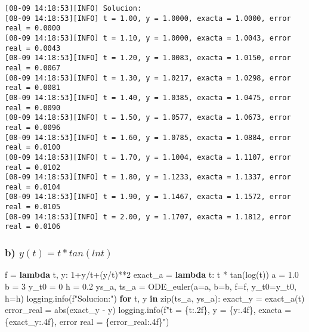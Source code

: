 \documentclass[
  letterpaper,
  DIV=11,
  numbers=noendperiod]{scrartcl}
\newenvironment{Shaded}{\begin{snugshade}}{\end{snugshade}}
\newcommand{\BuiltInTok}[1]{\textcolor[rgb]{0.00,0.23,0.31}{#1}}
\newcommand{\ControlFlowTok}[1]{\textcolor[rgb]{0.00,0.23,0.31}{\textbf{#1}}}
\newcommand{\DecValTok}[1]{\textcolor[rgb]{0.68,0.00,0.00}{#1}}
\newcommand{\FloatTok}[1]{\textcolor[rgb]{0.68,0.00,0.00}{#1}}
\newcommand{\KeywordTok}[1]{\textcolor[rgb]{0.00,0.23,0.31}{\textbf{#1}}}
\newcommand{\NormalTok}[1]{\textcolor[rgb]{0.00,0.23,0.31}{#1}}
\newcommand{\OperatorTok}[1]{\textcolor[rgb]{0.37,0.37,0.37}{#1}}
\newcommand{\SpecialCharTok}[1]{\textcolor[rgb]{0.37,0.37,0.37}{#1}}
\newcommand{\SpecialStringTok}[1]{\textcolor[rgb]{0.13,0.47,0.30}{#1}}
\begin{document}
\begin{verbatim}
[08-09 14:18:53][INFO] Solucion:
[08-09 14:18:53][INFO] t = 1.00, y = 1.0000, exacta = 1.0000, error real = 0.0000
[08-09 14:18:53][INFO] t = 1.10, y = 1.0000, exacta = 1.0043, error real = 0.0043
[08-09 14:18:53][INFO] t = 1.20, y = 1.0083, exacta = 1.0150, error real = 0.0067
[08-09 14:18:53][INFO] t = 1.30, y = 1.0217, exacta = 1.0298, error real = 0.0081
[08-09 14:18:53][INFO] t = 1.40, y = 1.0385, exacta = 1.0475, error real = 0.0090
[08-09 14:18:53][INFO] t = 1.50, y = 1.0577, exacta = 1.0673, error real = 0.0096
[08-09 14:18:53][INFO] t = 1.60, y = 1.0785, exacta = 1.0884, error real = 0.0100
[08-09 14:18:53][INFO] t = 1.70, y = 1.1004, exacta = 1.1107, error real = 0.0102
[08-09 14:18:53][INFO] t = 1.80, y = 1.1233, exacta = 1.1337, error real = 0.0104
[08-09 14:18:53][INFO] t = 1.90, y = 1.1467, exacta = 1.1572, error real = 0.0105
[08-09 14:18:53][INFO] t = 2.00, y = 1.1707, exacta = 1.1812, error real = 0.0106
\end{verbatim}

\subsubsection{\texorpdfstring{b)
\(y(t)=t *tan(ln t)\)}{b) y(t)=t *tan(ln t)}}\label{b-ytt-tanln-t}

\begin{Shaded}
\begin{Highlighting}[]
\NormalTok{f }\OperatorTok{=} \KeywordTok{lambda}\NormalTok{ t, y: }\DecValTok{1}\OperatorTok{+}\NormalTok{y}\OperatorTok{/}\NormalTok{t}\OperatorTok{+}\NormalTok{(y}\OperatorTok{/}\NormalTok{t)}\OperatorTok{**}\DecValTok{2}
\NormalTok{exact\_a }\OperatorTok{=} \KeywordTok{lambda}\NormalTok{ t: t }\OperatorTok{*}\NormalTok{ tan(log(t))}
\NormalTok{a }\OperatorTok{=} \FloatTok{1.0}
\NormalTok{b }\OperatorTok{=} \DecValTok{3}
\NormalTok{y\_t0 }\OperatorTok{=} \DecValTok{0}
\NormalTok{h }\OperatorTok{=} \FloatTok{0.2}
\NormalTok{ys\_a, ts\_a }\OperatorTok{=}\NormalTok{ ODE\_euler(a}\OperatorTok{=}\NormalTok{a, b}\OperatorTok{=}\NormalTok{b, f}\OperatorTok{=}\NormalTok{f, y\_t0}\OperatorTok{=}\NormalTok{y\_t0, h}\OperatorTok{=}\NormalTok{h)}
\NormalTok{logging.info(}\SpecialStringTok{f"Solucion:"}\NormalTok{)}
\ControlFlowTok{for}\NormalTok{ t, y }\KeywordTok{in} \BuiltInTok{zip}\NormalTok{(ts\_a, ys\_a):}
\NormalTok{    exact\_y }\OperatorTok{=}\NormalTok{ exact\_a(t)}
\NormalTok{    error\_real }\OperatorTok{=} \BuiltInTok{abs}\NormalTok{(exact\_y }\OperatorTok{{-}}\NormalTok{ y)}
\NormalTok{    logging.info(}\SpecialStringTok{f"t = }\SpecialCharTok{\{}\NormalTok{t}\SpecialCharTok{:.2f\}}\SpecialStringTok{, y = }\SpecialCharTok{\{}\NormalTok{y}\SpecialCharTok{:.4f\}}\SpecialStringTok{, exacta = }\SpecialCharTok{\{}\NormalTok{exact\_y}\SpecialCharTok{:.4f\}}\SpecialStringTok{, error real = }\SpecialCharTok{\{}\NormalTok{error\_real}\SpecialCharTok{:.4f\}}\SpecialStringTok{"}\NormalTok{)}
\end{Highlighting}
\end{Shaded}
\end{document}
